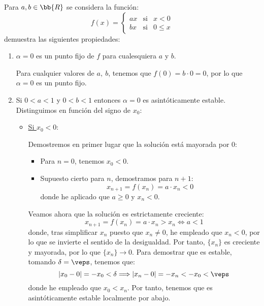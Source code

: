 \begin{ejercicio}
    Para $a,b\in \bb{R}$ se considera la función:
    \begin{equation*}
        f(x)=\left\{\begin{array}{lll}
            ax & \text{si} & x<0\\
            bx & \text{si} & 0\leq x
        \end{array}\right.
    \end{equation*}
    demuestra las siguientes propiedades:
    \begin{enumerate}
        \item $\alpha = 0$ es un punto fijo de $f$ para cualesquiera $a$ y $b$.

        Para cualquier valores de $a,~b$, tenemos que $f(0)=b\cdot 0=0$, por lo que $\alpha=0$ es un punto fijo.
        
        \item Si $0 < a < 1$ y $0 < b < 1$ entonces $\alpha = 0$ es asintóticamente estable.\\

        Distinguimos en función del signo de $x_0$:
        \begin{itemize}
            \item \ul{Si $x_0<0$}:

            Demostremos en primer lugar que la solución está mayorada por $0$:
            \begin{itemize}
                \item Para $n=0$, tenemos $x_0<0$.
                \item Supuesto cierto para $n$, demostramos para $n+1$:
                \begin{equation*}
                    x_{n+1} = f(x_n) = a\cdot x_n < 0
                \end{equation*}
                donde he aplicado que $a\geq 0$ y $x_n<0$.
            \end{itemize}

            Veamos ahora que la solución es estrictamente creciente:
            \begin{equation*}
                x_{n+1} = f(x_n) = a\cdot x_n > x_n \Longleftrightarrow a < 1
            \end{equation*}
            donde, tras simplificar $x_n$ puesto que $x_n\neq 0$, he empleado que $x_n<0$, por lo que se invierte el sentido de la desigualdad. Por tanto, $\{x_n\}$ es creciente y mayorada, por lo que $\{x_n\}\to 0$. Para demostrar que es estable, tomando $\delta=\veps$, tenemos que:
            \begin{equation*}
                |x_0-0|=-x_0 <\delta \Longrightarrow |x_n-0| = -x_n < -x_0 <\veps
            \end{equation*}
            donde he empleado que $x_0<x_n$. Por tanto, tenemos que es asintóticamente estable localmente por abajo.


\end{itemize}
\end{enumerate}
\end{ejercicio}
